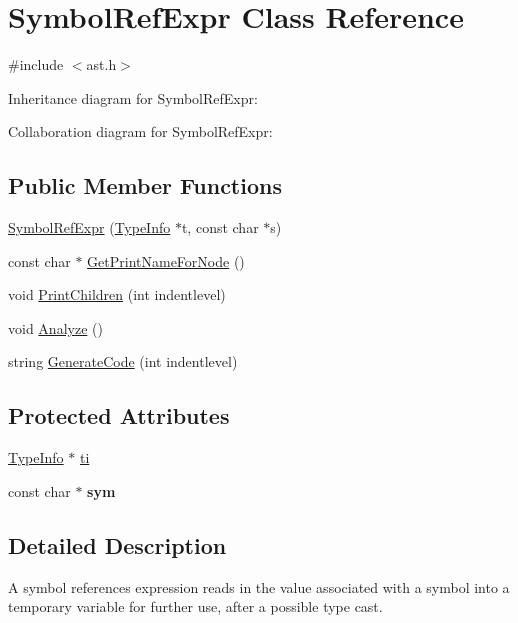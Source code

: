 \hypertarget{class_symbol_ref_expr}{}\section{Symbol\+Ref\+Expr Class Reference}
\label{class_symbol_ref_expr}


{\ttfamily \#include $<$ast.\+h$>$}



Inheritance diagram for Symbol\+Ref\+Expr\+:


Collaboration diagram for Symbol\+Ref\+Expr\+:
\subsection*{Public Member Functions}
\begin{DoxyCompactItemize}
\item 
\hyperlink{class_symbol_ref_expr_afc8337c9c2794b7221ef3f3356e5928b}{Symbol\+Ref\+Expr} (\hyperlink{class_type_info}{Type\+Info} $\ast$t, const char $\ast$s)
\item 
const char $\ast$ \hyperlink{class_symbol_ref_expr_adc3249d1505c60488bf5dc22d23f462b}{Get\+Print\+Name\+For\+Node} ()
\item 
void \hyperlink{class_symbol_ref_expr_a17635ba3b6120561fd912d2487d9a897}{Print\+Children} (int indentlevel)
\item 
void \hyperlink{class_symbol_ref_expr_aa410e63dd4602d66bda4e880afdb82e9}{Analyze} ()
\item 
string \hyperlink{class_symbol_ref_expr_a05ae76345e624e5c7085f49707685c6e}{Generate\+Code} (int indentlevel)
\end{DoxyCompactItemize}
\subsection*{Protected Attributes}
\begin{DoxyCompactItemize}
\item 
\hyperlink{class_type_info}{Type\+Info} $\ast$ \hyperlink{class_symbol_ref_expr_ab6892732ae00329f8526e8c1fe5e28b5}{ti}
\item 
\mbox{\label{class_symbol_ref_expr_aad73b9ace3c0e22cbe9bc151a70616fa}} 
const char $\ast$ {\bfseries sym}
\end{DoxyCompactItemize}


\subsection{Detailed Description}
A symbol references expression reads in the value associated with a symbol into a temporary variable for further use, after a possible type cast. 

